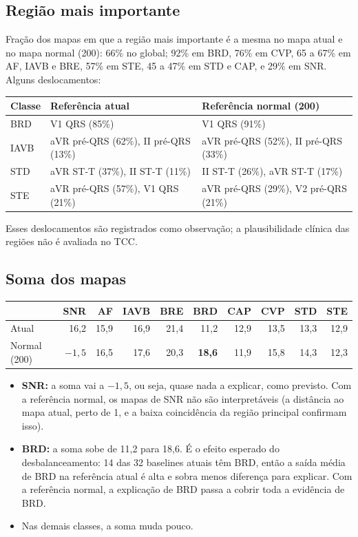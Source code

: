 \documentclass[11pt,a4paper]{article}
\begin{document}
\subsection{Região mais importante}
Fração dos mapas em que a região mais importante é a mesma no mapa atual e no mapa normal (200): 66\% no global; 92\% em BRD, 76\% em CVP, 65 a 67\% em AF, IAVB e BRE, 57\% em STE, 45 a 47\% em STD e CAP, e 29\% em SNR. Alguns deslocamentos:
\begin{center}\small
\begin{tabularx}{\linewidth}{lXX}
\toprule
\textbf{Classe} & \textbf{Referência atual} & \textbf{Referência normal (200)} \\
\midrule
BRD  & V1 QRS (85\%) & V1 QRS (91\%) \\
IAVB & aVR pré-QRS (62\%), II pré-QRS (13\%) & aVR pré-QRS (52\%), II pré-QRS (33\%) \\
STD  & aVR ST-T (37\%), II ST-T (11\%) & II ST-T (26\%), aVR ST-T (17\%) \\
STE  & aVR pré-QRS (57\%), V1 QRS (21\%) & aVR pré-QRS (29\%), V2 pré-QRS (21\%) \\
\bottomrule
\end{tabularx}
\end{center}
Esses deslocamentos são registrados como observação; a plausibilidade clínica das regiões não é avaliada no TCC.

\subsection{Soma dos mapas}
\begin{center}\small
\begin{tabular}{lrrrrrrrrr}
\toprule
& \textbf{SNR} & \textbf{AF} & \textbf{IAVB} & \textbf{BRE} & \textbf{BRD} & \textbf{CAP} & \textbf{CVP} & \textbf{STD} & \textbf{STE} \\
\midrule
Atual & 16,2 & 15,9 & 16,9 & 21,4 & 11,2 & 12,9 & 13,5 & 13,3 & 12,9 \\
Normal (200) & \textbf{$-1{,}5$} & 16,5 & 17,6 & 20,3 & \textbf{18,6} & 11,9 & 15,8 & 14,3 & 12,3 \\
\bottomrule
\end{tabular}
\end{center}
\begin{itemize}
\item \textbf{SNR:} a soma vai a $-1{,}5$, ou seja, quase nada a explicar, como previsto. Com a referência normal, os mapas de SNR não são interpretáveis (a distância ao mapa atual, perto de 1, e a baixa coincidência da região principal confirmam isso).
\item \textbf{BRD:} a soma sobe de 11,2 para 18,6. É o efeito esperado do desbalanceamento: 14 das 32 baselines atuais têm BRD, então a saída média de BRD na referência atual é alta e sobra menos diferença para explicar. Com a referência normal, a explicação de BRD passa a cobrir toda a evidência de BRD.
\item Nas demais classes, a soma muda pouco.
\end{itemize}
\end{document}
